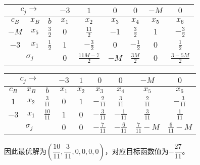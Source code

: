 \begin{solution}
        \begin{table}[H]
            \centering
            \begin{tabular}{|c|c|c|c|c|c|c|c|c|}
                \hline
                \multicolumn{3}{|c|}{$c_j\rightarrow$} & $-3$ & $1$ & $0$ & $0$ & $-M$ & $0$ \\
                \hline
                $c_B$ & $x_B$ & $b$ & $x_1$ & $x_2$ & $x_3$ & $x_4$ & $x_5$ & $x_6$ \\
                \hline
                $-M$& $x_5$ & $\tfrac32$ & $0$ & $\tfrac{11}2$ & $-1$ & $\tfrac32$ & $1$ & $-\tfrac32$\\
                \hline
                $-3$& $x_1$ & $\tfrac12$ & $1$ & $-\tfrac32$ & $0$ & $-\tfrac12$ & $0$ & $\tfrac12$\\
                \hline
                \multicolumn{3}{|c|}{$\sigma_j$} & $0$ & $\tfrac{11M-7}2$ & $-M$ & $\tfrac{3M}2$ & $0$ & $\tfrac{3-5M}2$\\
                \hline
            \end{tabular}
        \end{table}

        \begin{table}[H]
            \centering
            \begin{tabular}{|c|c|c|c|c|c|c|c|c|}
                \hline
                \multicolumn{3}{|c|}{$c_j\rightarrow$} & $-3$ & $1$ & $0$ & $0$ & $-M$ & $0$ \\
                \hline
                $c_B$ & $x_B$ & $b$ & $x_1$ & $x_2$ & $x_3$ & $x_4$ & $x_5$ & $x_6$ \\
                \hline
                $1$& $x_2$ & $\tfrac3{11}$ & $0$ & $1$ & $-\tfrac2{11}$ & $\tfrac3{11}$ & $\tfrac2{11}$ & $-\tfrac3{11}$\\
                \hline
                $-3$& $x_1$ & $\tfrac{10}{11}$ & $1$ & $0$ & $-\tfrac3{11}$ & $-\tfrac1{11}$ & $\tfrac3{11}$ & $\tfrac1{11}$\\
                \hline
                \multicolumn{3}{|c|}{$\sigma_j$} & $0$ & $0$ & $-\tfrac7{11}$ & $-\tfrac6{11}$ & $\tfrac7{11}-M$ & $\tfrac6{11}-M$ \\
                \hline
            \end{tabular}
        \end{table}

        因此最优解为$\left(\dfrac{10}{11},\dfrac{3}{11},0,0,0,0\right)$，对应目标函数值为$-\dfrac{27}{11}$。
    \end{solution}

